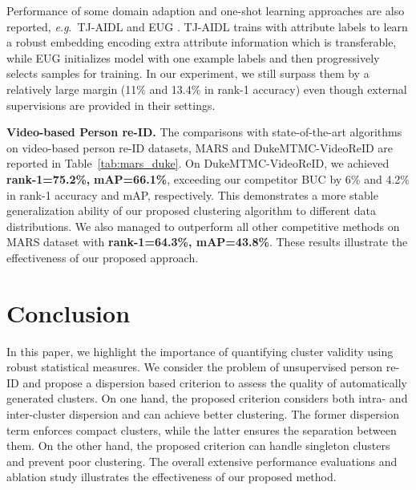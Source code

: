 \documentclass[journal]{IEEEtran}
\newcommand{\eg}{\textit{e.g}.}
\begin{document}
Performance of some domain adaption and one-shot learning approaches are also reported, \eg\ TJ-AIDL \cite{wang2018transferable} and EUG \cite{wu2019progressive}. TJ-AIDL \cite{wang2018transferable} trains with attribute labels to learn a robust embedding encoding extra attribute information which is transferable, while EUG \cite{wu2019progressive} initializes model with one example labels and then progressively selects samples for training. In our experiment, we still surpass them by a relatively large margin (11\% and 13.4\% in rank-1 accuracy) even though external supervisions are provided in their settings. 

\textbf{Video-based Person re-ID.} The comparisons with state-of-the-art algorithms on video-based person re-ID datasets, MARS and DukeMTMC-VideoReID are reported in Table~\ref{tab:mars_duke}. On DukeMTMC-VideoReID, we achieved \textbf{rank-1=75.2\%,} \textbf{mAP=66.1\%}, exceeding our competitor BUC \cite{lin2019bottom} by 6\% and 4.2\% in rank-1 accuracy and mAP, respectively. This demonstrates a more stable generalization ability of our proposed clustering algorithm to different data distributions. We also managed to outperform all other competitive methods on MARS dataset with \textbf{rank-1=64.3\%, mAP=43.8\%}. These results illustrate the effectiveness of our proposed approach.


\section{Conclusion}
\label{sec:conclusion}
In this paper, we highlight the importance of quantifying cluster validity using robust statistical measures. We consider the problem of unsupervised person re-ID and propose a dispersion based criterion to assess the quality of automatically generated clusters. On one hand, the proposed criterion considers both intra- and inter-cluster dispersion and can achieve better clustering. The former dispersion term enforces compact clusters, while the latter ensures the separation between them. On the other hand, the proposed criterion can handle singleton clusters and prevent poor clustering. The overall extensive performance evaluations and ablation study illustrates the effectiveness of our proposed method.



\ifCLASSOPTIONcaptionsoff
  \newpage
\fi



{\small


}
\end{document}
